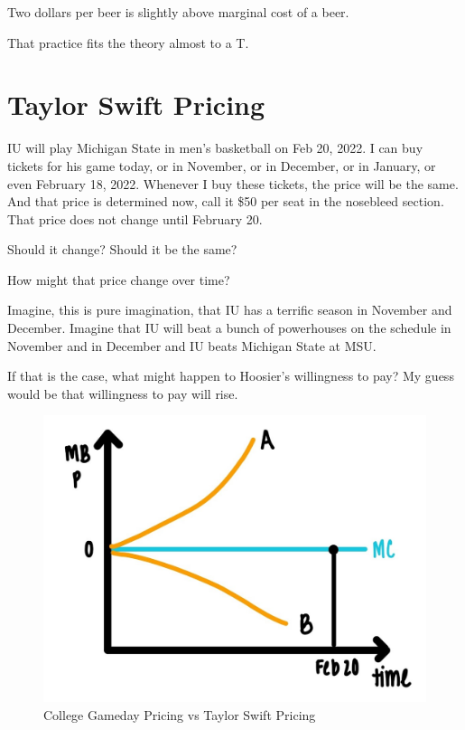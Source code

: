 \documentclass[
]{book}
\begin{document}
Two dollars per beer is slightly above marginal cost of a beer.

That practice fits the theory almost to a T.

\hypertarget{taylor-swift-pricing}{%
\section{Taylor Swift Pricing}\label{taylor-swift-pricing}}

IU will play Michigan State in men's basketball on Feb 20, 2022. I can buy tickets for his game today, or in November, or in December, or in January, or even February 18, 2022. Whenever I buy these tickets, the price will be the same. And that price is determined now, call it \$50 per seat in the nosebleed section.
That price does not change until February 20.

Should it change? Should it be the same?

How might that price change over time?

Imagine, this is pure imagination, that IU has a terrific season in November and December. Imagine that IU will beat a bunch of powerhouses on the schedule in November and in December and IU beats Michigan State at MSU.

If that is the case, what might happen to Hoosier's willingness to pay? My guess would be that willingness to pay will rise.

\begin{figure}

{\centering \includegraphics[width=0.75\linewidth]{img/monopoly/fig11} 

}

\caption{College Gameday Pricing vs Taylor Swift Pricing}\label{fig:monopoly11}
\end{figure}
\end{document}

